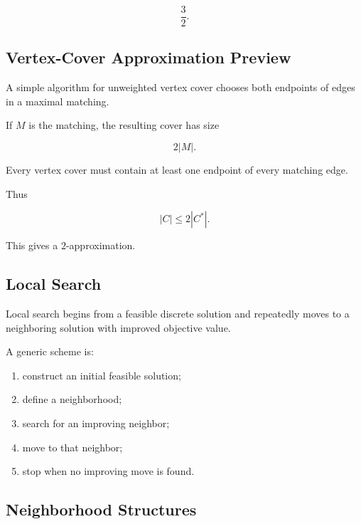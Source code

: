 \[
\boxed{
\frac32.
}
\]

\subsection{Vertex-Cover Approximation Preview}
\label{subsec:vertex-cover-approximation}

A simple algorithm for unweighted vertex cover chooses both endpoints of
edges in a maximal matching.

If \(M\) is the matching, the resulting cover has size

\[
2|M|.
\]

Every vertex cover must contain at least one endpoint of every matching
edge.

Thus

\[
\boxed{
|C|
\leq
2|C^*|.
}
\]

This gives a \(2\)-approximation.

\subsection{Local Search}
\label{subsec:local-search-combinatorial}

Local search begins from a feasible discrete solution and repeatedly moves
to a neighboring solution with improved objective value.

A generic scheme is:

\begin{enumerate}
    \item construct an initial feasible solution;
    \item define a neighborhood;
    \item search for an improving neighbor;
    \item move to that neighbor;
    \item stop when no improving move is found.
\end{enumerate}

\subsection{Neighborhood Structures}
\label{subsec:combinatorial-neighborhoods}

